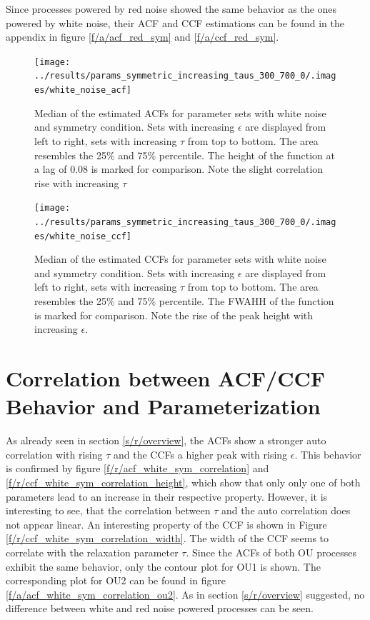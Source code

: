 \documentclass[a4paper,12pt,oneside]{book}
\theoremstyle{break}
\begin{document}
Since processes powered by red noise showed the same behavior as the ones powered by white noise, their ACF and CCF estimations can be found in the appendix in figure \ref{f/a/acf_red_sym} and \ref{f/a/ccf_red_sym}.

\begin{figure}
	\texttt{[image: ../results/params\_symmetric\_increasing\_taus\_300\_700\_0/.images/white\_noise\_acf]}%
	\caption{Median of the estimated ACFs for parameter sets with white noise and symmetry condition. Sets with increasing $\epsilon$ are displayed from left to right, sets with increasing $\tau$ from top to bottom. The area resembles the 25\% and 75\% percentile. The height of the function at a lag of 0.08 is marked for comparison. Note the slight correlation rise with increasing $\tau$ }%
	\label{f/r/acf_white_sym}%
\end{figure}

\begin{figure}
	\texttt{[image: ../results/params\_symmetric\_increasing\_taus\_300\_700\_0/.images/white\_noise\_ccf]}%
	\caption{Median of the estimated CCFs for parameter sets with white noise and symmetry condition. Sets with increasing $\epsilon$ are displayed from left to right, sets with increasing $\tau$ from top to bottom. The area resembles the 25\% and 75\% percentile. The \ac{FWAHH} of the function is marked for comparison. Note the rise of the peak height with increasing $\epsilon$. }%
	\label{f/r/ccf_white_sym}
\end{figure}


\section{Correlation between ACF/CCF Behavior and Parameterization}\label{s/r/correlation_sym}
As already seen in section \ref{s/r/overview}, the ACFs show a stronger auto correlation with rising $\tau$ and the CCFs a higher peak with rising $\epsilon$. This behavior is confirmed by figure \ref{f/r/acf_white_sym_correlation} and \ref{f/r/ccf_white_sym_correlation_height}, which show that only only one of both parameters lead to an increase in their respective property.
However, it is interesting to see, that the correlation between $\tau$ and the auto correlation does not appear linear.
An interesting property of the CCF is shown in Figure \ref{f/r/ccf_white_sym_correlation_width}. The width of the CCF seems to correlate with the relaxation parameter $\tau$.
Since the ACFs of both OU processes exhibit the same behavior, only the contour plot for OU1 is shown. The corresponding plot for OU2 can be found in figure \ref{f/a/acf_white_sym_correlation_ou2}.
As in section \ref{s/r/overview} suggested, no difference between white and red  noise powered processes  can be seen.
\end{document}
